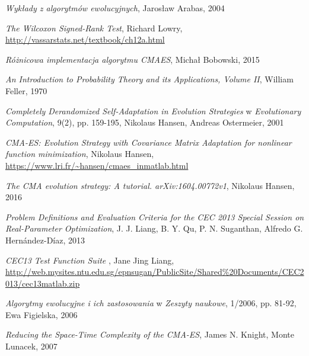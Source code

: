 \documentclass{mini}
\begin{document}
\begin{thebibliography}{9}

\emph{Wykłady z algorytmów ewolucyjnych}, Jarosław Arabas, 2004

\emph{The Wilcoxon Signed-Rank Test}, Richard Lowry, \url{http://vassarstats.net/textbook/ch12a.html}

\emph{Różnicowa implementacja algorytmu CMAES}, Michał Bobowski, 2015

\emph{An Introduction to Probability Theory and its Applications, Volume II}, William Feller, 1970

\emph{Completely Derandomized Self-Adaptation in Evolution Strategies} w \emph{Evolutionary Computation}, 9(2), pp. 159-195, Nikolaus Hansen, Andreas Ostermeier, 2001

\emph{CMA-ES: Evolution Strategy with Covariance Matrix Adaptation for nonlinear function minimization}, Nikolaus Hansen, \url{https://www.lri.fr/~hansen/cmaes\_inmatlab.html}

\emph{The CMA evolution strategy: A tutorial. arXiv:1604.00772v1}, Nikolaus Hansen, 2016

\emph{Problem Definitions and Evaluation Criteria for the CEC 2013 Special Session on Real-Parameter Optimization}, J. J. Liang, B. Y. Qu, P. N. Suganthan, Alfredo G. Hernández-Díaz, 2013

\emph{CEC13 Test Function Suite }, Jane Jing Liang, \url{http://web.mysites.ntu.edu.sg/epnsugan/PublicSite/Shared%20Documents/CEC2013/cec13matlab.zip}

\emph{Algorytmy ewolucyjne i ich zastosowania} w \emph{Zeszyty naukowe}, 1/2006, pp. 81-92, Ewa Figielska, 2006

\emph{Reducing the Space-Time Complexity of the CMA-ES}, James N. Knight, Monte Lunacek, 2007

\end{thebibliography}

\makestatement
\end{document}
